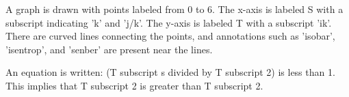 A graph is drawn with points labeled from 0 to 6. The x-axis is labeled S with a subscript indicating 'k' and 'j/k'. The y-axis is labeled T with a subscript 'ik'. There are curved lines connecting the points, and annotations such as 'isobar', 'isentrop', and 'senber' are present near the lines. 

An equation is written: 
(T subscript s divided by T subscript 2) is less than 1.
This implies that T subscript 2 is greater than T subscript 2.